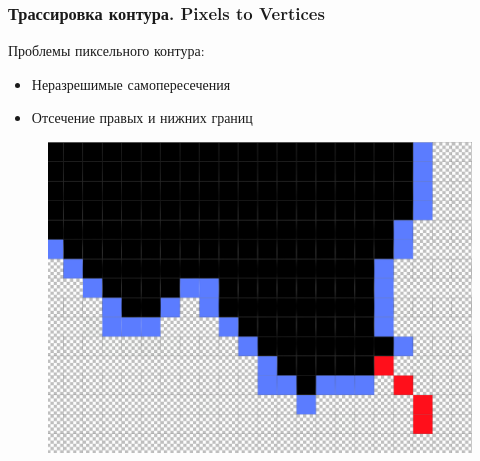 \documentclass[10pt, unicode]{beamer}
\begin{document}
\begin{frame}
\begin{figure}[H]
\begin{subfigure}[t]{.49\linewidth}
            \end{subfigure}
        \end{figure}
    \end{frame}
    \begin{frame}
        \frametitle{Трассировка контура. Pixels to Vertices}
        Проблемы пиксельного контура:
        \begin{itemize}
            \item Неразрешимые самопересечения
            \item Отсечение правых и нижних границ
        \end{itemize}
        \begin{figure}[H]
            \centering
            \includegraphics[scale=0.25]{SelfIntersectingContour1.png}
        \end{figure}
    \end{frame}
\end{document}
